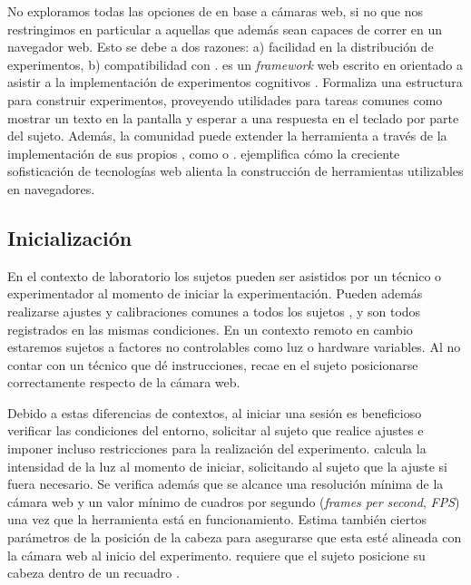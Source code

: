 No exploramos todas las opciones de \eyetracking en base a cámaras web, si no
que nos restringimos en particular a aquellas que además sean capaces de correr
en un navegador web.
Esto se debe a dos razones:
a) facilidad en la distribución de experimentos,
b) compatibilidad con \jspsych.
\jspsych es un \textit{framework} web escrito en \js orientado a asistir a la
implementación de experimentos cognitivos \cite{joshua_2015_jspsych}.
Formaliza una estructura para construir experimentos, proveyendo utilidades
para tareas comunes como mostrar un texto en la pantalla y esperar a una
respuesta en el teclado por parte del sujeto.
Además, la comunidad puede extender la herramienta a través de la
implementación de sus propios \plugin, como \psychophysics
\cite{kuroki_2021_psycho_physics} o \virtualchinrest
\cite{li_2020_virtual_chinrest}.
\jspsych ejemplifica cómo la creciente sofisticación de tecnologías web alienta
la construcción de herramientas utilizables en navegadores.

\subsection{Inicialización}

En el contexto de laboratorio los sujetos pueden ser asistidos por un técnico o
experimentador al momento de iniciar la experimentación.
Pueden además realizarse ajustes y calibraciones comunes a todos los sujetos
\cite{hansen_2009_eye_of_the_beholder}, y son todos registrados en las mismas
condiciones.
En un contexto remoto en cambio estaremos sujetos a factores no controlables
como luz o hardware variables.
Al no contar con un técnico que dé instrucciones, recae en el sujeto
posicionarse correctamente respecto de la cámara web.

Debido a estas diferencias de contextos, al iniciar una sesión es beneficioso
verificar las condiciones del entorno, solicitar al sujeto que realice ajustes
e imponer incluso restricciones para la realización del experimento.
\turkergaze \cite{xu_2015_turker_gaze} calcula la intensidad de la luz al
momento de iniciar, solicitando al sujeto que la ajuste si fuera necesario.
Se verifica además que se alcance una resolución mínima de la cámara web y un
valor mínimo de cuadros por segundo (\textit{frames per second},
\textit{FPS}) una vez que la herramienta está en funcionamiento.
Estima también ciertos parámetros de la posición de la cabeza para asegurarse
que esta esté alineada con la cámara web al inicio del experimento.
\webgazer requiere que el sujeto posicione su cabeza dentro de un recuadro
\cite{papoutsaki_2016_webgazer}.

